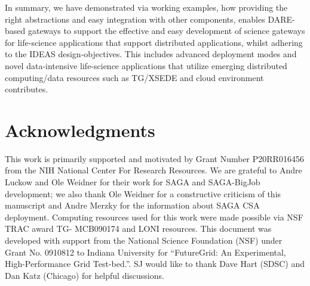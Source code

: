 \documentclass[]{svjour3}
\begin{document}
In summary, we have demonstrated via working examples, how providing
the right abstractions and easy integration with other components,
enables DARE-based gateways to support the effective and easy
development of science gateways for life-science applications that
support distributed applications, whilst adhering to the IDEAS
design-objectives. This includes advanced deployment modes and novel
data-intensive life-science applications that utilize emerging
distributed computing/data resources such as TG/XSEDE and cloud
environment contributes.

\section*{Acknowledgments}
This work is primarily supported and motivated by Grant Number
P20RR016456 from the NIH National Center For Research Resources. We
are grateful to Andre Luckow and Ole Weidner for their work for SAGA
and SAGA-BigJob development; we also thank Ole Weidner for a
constructive criticism of this manuscript and Andre Merzky for the information
about SAGA CSA deployment. Computing resources used for this work were made possible via NSF TRAC award TG-
MCB090174 and LONI resources. This document was developed with support from the
National Science Foundation (NSF) under Grant No. 0910812 to Indiana
University for ``FutureGrid: An Experimental, High-Performance Grid
Test-bed.''. SJ would like to thank Dave Hart (SDSC) and Dan Katz
(Chicago) for helpful discussions.



%

%

\end{document}
